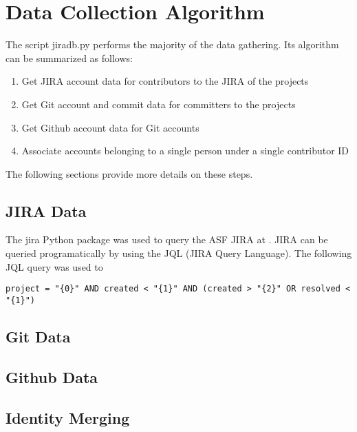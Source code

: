 \section{Data Collection Algorithm}
The script jiradb.py performs the majority of the data gathering. Its algorithm can be summarized as follows:
\begin{enumerate}
	\item Get JIRA account data for contributors to the JIRA of the projects
	\item Get Git account and commit data for committers to the projects
	\item Get Github account data for Git accounts
	\item Associate accounts belonging to a single person under a single contributor ID
\end{enumerate}
The following sections provide more details on these steps.

\subsection{JIRA Data}
The jira Python package was used to query the ASF JIRA at \ASFJIRAURL. JIRA can be queried programatically by using the JQL (JIRA Query Language). The following JQL query was used to 
\begin{verbatim}
project = "{0}" AND created < "{1}" AND (created > "{2}" OR resolved < "{1}")
\end{verbatim}
\subsection{Git Data}
\subsection{Github Data}
\subsection{Identity Merging}